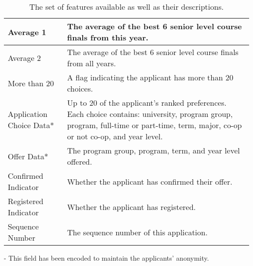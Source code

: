 \documentclass[12pt,twoside]{report}
\begin{document}
\begin{table}[!hb]
\begin{center}
\begin{tabular}{| C{3.7cm} | C{10.3cm} |}
	Average 1						&The average of the best 6 senior level course finals from this year.\\\hline
	Average 2						&The average of the best 6 senior level course finals from all years.\\\hline
	More than 20					&A flag indicating the applicant has more than 20 choices.\\\hline
	Application Choice Data*		&Up to 20 of the applicant's ranked preferences. Each choice contains: university, program group, program, full-time or part-time, term, major, co-op or not co-op, and year level.\\\hline
	Offer Data*						&The program group, program, term, and year level offered.\\\hline
	Confirmed Indicator				&Whether the applicant has confirmed their offer.\\\hline
	Registered Indicator			&Whether the applicant has registered.\\\hline
	Sequence Number					&The sequence number of this application.\\\hline
\end{tabular}
\caption{ The set of features available as well as their descriptions.}
\end{center}
\end{table}
\small* - This field has been encoded to maintain the applicants' anonymity.

\newpage
\end{document}
